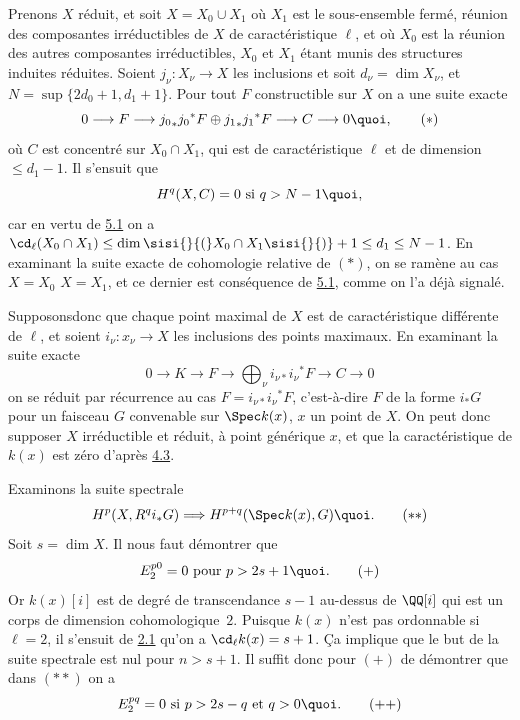 \documentclass[10pt]{../fichiers-configuration-latex/smfart}
\begin{document}
Prenons $X$ réduit, et soit $X=X_{0}\cup X_1$ où $X_1$ est le
sous-ensemble fermé, réunion des composantes irréductibles de $X$ de
caractéristique $\ell$, et où $X_{0}$ est la réunion des autres
composantes irréductibles, $X_{0}$ et $X_1$ étant munis des
structures induites réduites. Soient $j_{\nu}:X_{\nu}\rightarrow X$
les inclusions et soit $d_{\nu}=\dim X_{\nu}$, et $N=\sup
\{2d_{0}+1, d_1+1\}$. Pour tout $F$ constructible sur $X$ on a une suite exacte
\begin{equation*}
0\longrightarrow F\longrightarrow
{j_{0}}_{\ast} j_{0}{}^{\ast}F\oplus {j_1}_{\ast} j_1
{}^{\ast}F\longrightarrow C\longrightarrow 0{\quoi},\tag{$\ast$}
\end{equation*}
où $C$ est concentré sur $X_{0}\cap X_1$, qui est de
caractéristique $\ell$ et de dimension $\leq d_1-1$. Il s'ensuit que
$$
H^q(X,C)=0\mbox{ si } q>N-1{\quoi},
$$
car en vertu de \hyperref[X.thm5.1]{5.1} on a $\cd_{\ell}(X_{0}\cap X_1)\leq \dim
\sisi{}{(}X_{0}\cap X_1\sisi{}{)}+1\leq d_1\leq N-1$. En examinant la suite exacte de
cohomologie relative de $(\ast)$, on se ramène au cas $X=X_{0}$ 
$X=X_1$, et ce dernier est conséquence de \hyperref[X.thm5.1]{5.1}, comme on l'a déjà
signalé.

Supposons\pageoriginale donc que chaque point maximal de $X$ est 
de caractéristique
différente de $\ell$, et soient $i_{\nu}:x_{\nu}\rightarrow X$ les
inclusions des points maximaux. En examinant la suite exacte
$$
0\longrightarrow K\longrightarrow F\longrightarrow \bigoplus_{\nu}
i_{\nu\ast}i_{\nu}{}^{\ast}F\longrightarrow C\longrightarrow 0
$$
on se réduit par récurrence au cas $F=i_{\nu\ast}i_{\nu}{}^{\ast}F$,
c'est-à-dire $F$ de la forme $i_{\ast}G$ pour un faisceau $G$
convenable sur $\Spec k(x)$, $x$ un point de $X$. On peut donc
supposer $X$ irréductible et réduit, à point générique $x$, et que la
caractéristique de $k(x)$ est zéro d'après \hyperref[X.cor4.3]{4.3}.

Examinons la suite spectrale
\begin{equation*}
H^p(X,R^qi_{\ast}G)\Longrightarrow H^{p+q}(\Spec k(x),
G){\quoi}.\tag{${\ast}{\ast}$} 
\end{equation*}
Soit $s=\dim X$. Il nous faut démontrer que
\begin{equation*}
E^{p0}_2=0\mbox{ pour } p> 2s+1{\quoi}.\tag{$+$}
\end{equation*}
Or $k(x)[i]$ est de degré de transcendance $s-1$ au-dessus de $\QQ[i]$
qui est un corps de dimension cohomologique $2$. Puisque $k(x)$ n'est
pas ordonnable si $\ell=2$, il s'ensuit de \hyperref[X.thm2.1]{2.1} qu'on a
$\cd_{\ell}k(x)=s+1$. Ça implique que le but de la suite spectrale
est nul pour $n>s+1$. Il suffit donc pour $(+)$ de démontrer que dans
$({\ast}{\ast})$ on a
\begin{equation*}
E^{pq}_2=0\mbox{ si } p>2s-q\mbox{ et } q>0{\quoi}.\tag{${+}{+}$}
\end{equation*}
\end{document}
